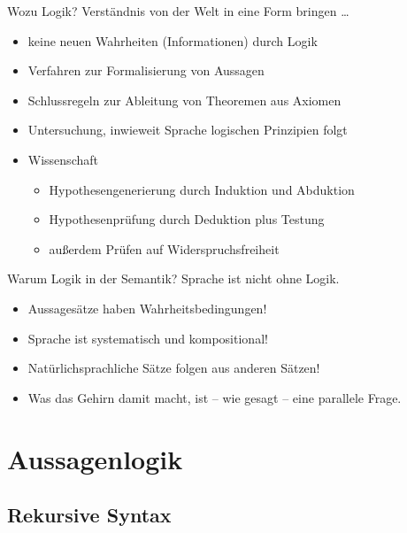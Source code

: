 \begin{frame}
  {Wozu Logik?}
  \onslide<+->
  \onslide<+->
  Verständnis von der Welt in eine Form bringen \ldots\\
  \Halbzeile
  \begin{itemize}[<+->]
    \item keine neuen Wahrheiten (Informationen) durch Logik
    \item Verfahren zur \alert{Formalisierung von Aussagen}
    \item \alert{Schlussregeln} zur Ableitung von Theoremen aus Axiomen
    \item Untersuchung, \alert{inwieweit Sprache logischen Prinzipien folgt}
    \item Wissenschaft
      \begin{itemize}[<+->]
        \item Hypothesengenerierung durch Induktion und Abduktion
        \item \alert{Hypothesenprüfung} durch \alert{Deduktion} plus Testung
        \item außerdem \alert{Prüfen auf Widerspruchsfreiheit}
      \end{itemize}
  \end{itemize}
\end{frame}

\begin{frame}
  {Warum Logik in der Semantik?}
  \onslide<+->
  \onslide<+->
  Sprache ist nicht ohne Logik.\\
  \Halbzeile
  \begin{itemize}[<+->]
    \item Aussagesätze haben \alert{Wahrheitsbedingungen}!
    \item Sprache ist \alert{systematisch} und \alert{kompositional}!
    \item Natürlichsprachliche Sätze \alert{folgen} aus anderen Sätzen!\\
      \Halbzeile
    \item Was das Gehirn damit macht, ist -- wie gesagt -- eine parallele Frage.
  \end{itemize}
\end{frame}

\section{Aussagenlogik}

\subsection{Rekursive Syntax}

